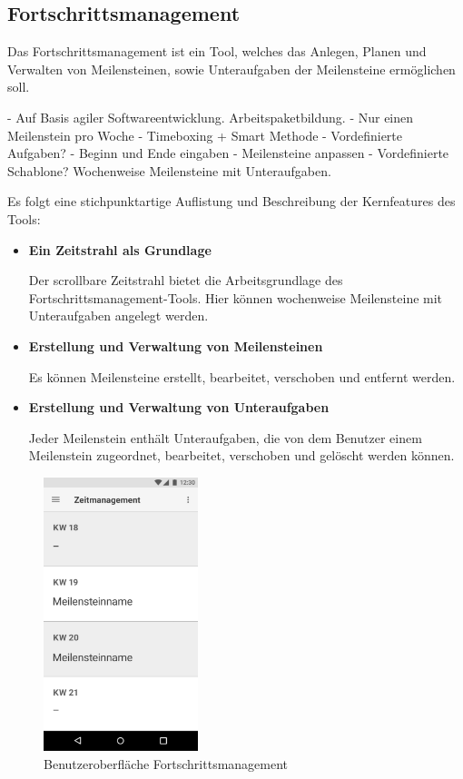 \documentclass{scrreprt}
\begin{document}
\newpage
\subsection{Fortschrittsmanagement}
Das Fortschrittsmanagement ist ein Tool, welches das Anlegen, Planen und Verwalten von Meilensteinen, sowie Unteraufgaben der Meilensteine ermöglichen soll. 

- Auf Basis agiler Softwareentwicklung. Arbeitspaketbildung.
- Nur einen Meilenstein pro Woche
- Timeboxing + Smart Methode
- Vordefinierte Aufgaben?
- Beginn und Ende eingaben
- Meilensteine anpassen
- Vordefinierte Schablone? Wochenweise Meilensteine mit Unteraufgaben.

Es folgt eine stichpunktartige Auflistung und Beschreibung der Kernfeatures des Tools:
\begin{itemize}
\item \textbf{Ein Zeitstrahl als Grundlage}
\par Der scrollbare Zeitstrahl bietet die Arbeitsgrundlage des Fortschrittsmanagement-Tools. Hier können wochenweise Meilensteine mit Unteraufgaben angelegt werden.
\item \textbf{Erstellung und Verwaltung von Meilensteinen}
\par Es können Meilensteine erstellt, bearbeitet, verschoben und entfernt werden.
\item \textbf{Erstellung und Verwaltung von Unteraufgaben}
\par Jeder Meilenstein enthält Unteraufgaben, die von dem Benutzer einem Meilenstein zugeordnet, bearbeitet, verschoben und gelöscht werden können.
\end{itemize}

\begin{figure}[H]
	\centering
	\includegraphics[width=0.4\textwidth, keepaspectratio]{Bilder/Zeitmanagement.png}
	\caption{Benutzeroberfläche Fortschrittsmanagement}
	\label{img:fortschrittsmanagement}
\end{figure}
\end{document}
